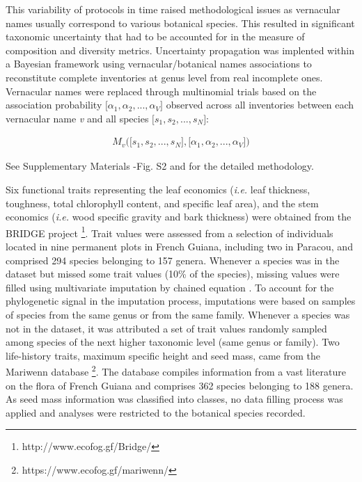 \documentclass[fleqn,10pt]{ArtEcoFoG} %
\begin{document}
This variability of protocols in time raised methodological issues as vernacular names usually correspond to various botanical species.
This resulted in significant taxonomic uncertainty that had to be accounted for in the measure of composition and diversity metrics.
Uncertainty propagation was implented within a Bayesian framework using vernacular/botanical names associations to reconstitute complete inventories at genus level from real incomplete ones.
Vernacular names were replaced through multinomial trials based on the association probability \(\big[\alpha_1, \alpha_2,..., \alpha_V\big]\) observed across all inventories between each vernacular name \emph{v} and all species \(\big[s_1, s_2,..., s_N\big]\):

\begin{align}
M_v\Big(\big[s_1, s_2,..., s_N\big],\big[\alpha_1, \alpha_2,..., \alpha_V\big]\Big) \nonumber
\end{align}

See Supplementary Materials -Fig. S2 and \citet{Aubry-Kientz2013} for the detailed methodology.

Six functional traits representing the leaf economics (\emph{i.e.} leaf thickness, toughness, total chlorophyll content, and specific leaf area), and the stem economics (\emph{i.e.} wood specific gravity and bark thickness) were obtained from the BRIDGE project \footnote{http://www.ecofog.gf/Bridge/}.
Trait values were assessed from a selection of individuals located in nine permanent plots in French Guiana, including two in Paracou, and comprised 294 species belonging to 157 genera.
Whenever a species was in the dataset but missed some trait values (10\% of the species), missing values were filled using multivariate imputation by chained equation \citep{Mice2011}.
To account for the phylogenetic signal in the imputation process, imputations were based on samples of species from the same genus or from the same family.
Whenever a species was not in the dataset, it was attributed a set of trait values randomly sampled among species of the next higher taxonomic level (same genus or family).
Two life-history traits, maximum specific height and seed mass, came from the Mariwenn database \footnote{https://www.ecofog.gf/mariwenn/}.
The database compiles information from a vast literature on the flora of French Guiana \citep{Ollivier2007} and comprises 362 species belonging to 188 genera.
As seed mass information was classified into classes, no data filling process was applied and analyses were restricted to the botanical species recorded.
\end{document}
